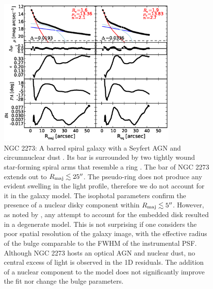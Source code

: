 \documentclass[preprint2]{emulateapj}
\newcommand{\fitfigurewidth}{0.8\textwidth}
\begin{document}
  \begin{figure}[h]
  \begin{center}
  \includegraphics[width=\fitfigurewidth]{images/n2273_1Dfit.eps}
  \caption{NGC 2273: 
  A barred spiral galaxy with a Seyfert AGN \citep{contini1998} 
  and circumnuclear dust \citep{simoeslopes2007}. 
  Its bar is surrounded by two tightly wound star-forming spiral arms that resemble a ring \citep{comeron2010}. 
  The bar of NGC 2273 extends out to $R_{\rm maj} \lesssim 25''$. 
  The pseudo-ring does not produce any evident swelling in the light profile, 
  therefore we do not account for it in the galaxy model.
  The isophotal parameters confirm the presence of a nuclear disky component within $R_{\rm maj} \lesssim 5''$.
  However, as noted by \cite{laurikainen2005}, any attempt to account for the embedded disk resulted in a degenerate model. 
  This is not surprising if one considers the poor spatial resolution of the galaxy image, 
  with the effective radius of the bulge comparable to the FWHM of the instrumental PSF.
  Although NGC 2273 hosts an optical AGN and nuclear dust, no central excess of light is observed in the 1D residuals.
  The addition of a nuclear component to the model does not significantly improve the fit nor change the bulge parameters. 
  }
  \end{center}
  \end{figure}
\end{document}
